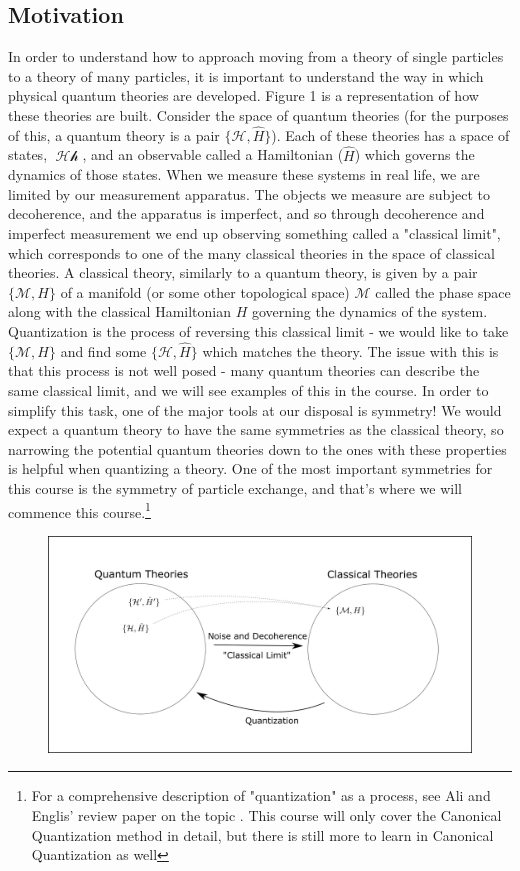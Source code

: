 \documentclass{article}
\DeclareMathOperator{\Hh}{\mathcal{Hh}}
\begin{document}
\subsection{Motivation}
In order to understand how to approach moving from a theory of single particles to a theory of many particles, it is important to understand the way in which physical quantum theories are developed. Figure 1 is a representation of how these theories are built. Consider the space of quantum theories (for the purposes of this, a quantum theory is a pair $\{\mathcal{H},\hat H\}$). Each of these theories has a space of states, $\Hh$, and an observable called a Hamiltonian ($\hat H$) which governs the dynamics of those states. When we measure these systems in real life, we are limited by our measurement apparatus. The objects we measure are subject to decoherence, and the apparatus is imperfect, and so through decoherence and imperfect measurement we end up observing something called a "classical limit", which corresponds to one of the many classical theories in the space of classical theories. A classical theory, similarly to a quantum theory, is given by a pair $\{\mathcal{M},H\}$ of a manifold (or some other topological space) $\mathcal{M}$ called the phase space along with the classical Hamiltonian $H$ governing the dynamics of the system. Quantization is the process of reversing this classical limit - we would like to take $\{\mathcal{M},H\}$ and find some $\{\mathcal{H},\hat H\}$ which matches the theory. The issue with this is that this process is not well posed - many quantum theories can describe the same classical limit, and we will see examples of this in the course. In order to simplify this task, one of the major tools at our disposal is symmetry! We would expect a quantum theory to have the same symmetries as the classical theory, so narrowing the potential quantum theories down to the ones with these properties is helpful when quantizing a theory. One of the most important symmetries for this course is the symmetry of particle exchange, and that's where we will commence this course.\footnote{For a comprehensive description of "quantization" as a process, see Ali and Englis' review paper on the topic \cite{ali2005quantization}. This course will only cover the Canonical Quantization method in detail, but there is still more to learn in Canonical Quantization as well}
\begin{figure}[ht]
    \centering
    \includegraphics[width=\linewidth]{Figures/fig1.png}
    \caption*{}
    \label{fig:fig11}
\end{figure}
\pagebreak
\end{document}
